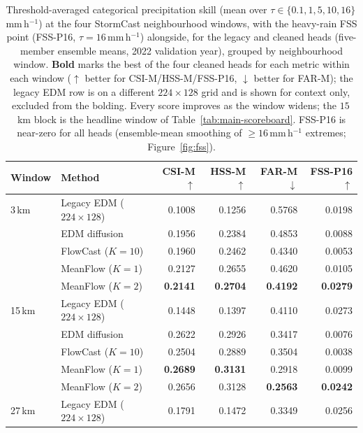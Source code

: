 \begin{table}[htbp]
  \centering
  \caption[Precipitation skill across pooling windows]{Threshold-averaged categorical precipitation skill (mean over $\tau \in \{0.1, 1, 5, 10, 16\}$\,mm\,h$^{-1}$) at the four StormCast neighbourhood windows, with the heavy-rain FSS point (FSS-P16, $\tau = 16$\,mm\,h$^{-1}$) alongside, for the legacy and cleaned heads (five-member ensemble means, 2022 validation year), grouped by neighbourhood window. \textbf{Bold} marks the best of the four cleaned heads for each metric within each window ($\uparrow$ better for CSI-M/HSS-M/FSS-P16, $\downarrow$ better for FAR-M); the legacy EDM row is on a different $224{\times}128$ grid and is shown for context only, excluded from the bolding. Every score improves as the window widens; the $15$\,km block is the headline window of Table~\ref{tab:main-scoreboard}. FSS-P16 is near-zero for all heads (ensemble-mean smoothing of $\geq 16$\,mm\,h$^{-1}$ extremes; Figure~\ref{fig:fss}).}
  \label{tab:precip-window}
  \small
  \setlength{\tabcolsep}{6pt}
  \begin{tabular}{llrrrr}
    \toprule
    Window & Method & CSI-M$\uparrow$ & HSS-M$\uparrow$ & FAR-M$\downarrow$ & FSS-P16$\uparrow$ \\
    \midrule
    3\,km  & Legacy EDM ($224{\times}128$) & 0.1008 & 0.1256 & 0.5768 & 0.0198 \\
           & EDM diffusion        & 0.1956 & 0.2384 & 0.4853 & 0.0088 \\
           & FlowCast ($K{=}10$)  & 0.1960 & 0.2462 & 0.4340 & 0.0053 \\
           & MeanFlow ($K{=}1$)   & 0.2127 & 0.2655 & 0.4620 & 0.0105 \\
           & MeanFlow ($K{=}2$)   & \textbf{0.2141} & \textbf{0.2704} & \textbf{0.4192} & \textbf{0.0279} \\
    \midrule
    15\,km & Legacy EDM ($224{\times}128$) & 0.1448 & 0.1397 & 0.4110 & 0.0273 \\
           & EDM diffusion        & 0.2622 & 0.2926 & 0.3417 & 0.0076 \\
           & FlowCast ($K{=}10$)  & 0.2504 & 0.2889 & 0.3504 & 0.0038 \\
           & MeanFlow ($K{=}1$)   & \textbf{0.2689} & \textbf{0.3131} & 0.2918 & 0.0099 \\
           & MeanFlow ($K{=}2$)   & 0.2656 & 0.3128 & \textbf{0.2563} & \textbf{0.0242} \\
    \midrule
    27\,km & Legacy EDM ($224{\times}128$) & 0.1791 & 0.1472 & 0.3349 & 0.0256 \\

\end{tabular}
\end{table}
